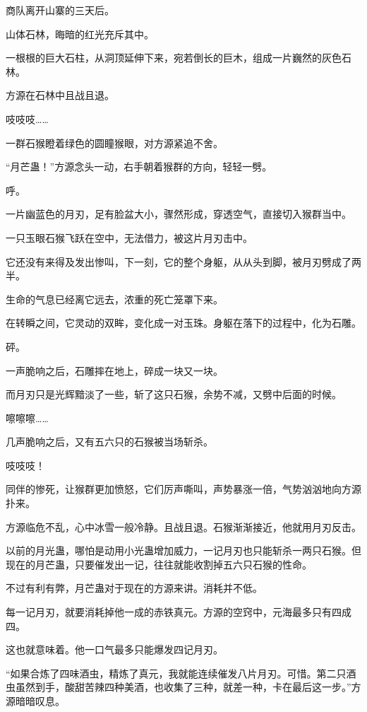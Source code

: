 
\begin{this_body}



商队离开山寨的三天后。

山体石林，晦暗的红光充斥其中。

一根根的巨大石柱，从洞顶延伸下来，宛若倒长的巨木，组成一片巍然的灰色石林。

方源在石林中且战且退。

吱吱吱……

一群石猴瞪着绿色的圆瞳猴眼，对方源紧追不舍。

“月芒蛊！”方源念头一动，右手朝着猴群的方向，轻轻一劈。

呼。

一片幽蓝色的月刃，足有脸盆大小，骤然形成，穿透空气，直接切入猴群当中。

一只玉眼石猴飞跃在空中，无法借力，被这片月刃击中。

它还没有来得及发出惨叫，下一刻，它的整个身躯，从从头到脚，被月刃劈成了两半。

生命的气息已经离它远去，浓重的死亡笼罩下来。

在转瞬之间，它灵动的双眸，变化成一对玉珠。身躯在落下的过程中，化为石雕。

砰。

一声脆响之后，石雕摔在地上，碎成一块又一块。

而月刃只是光辉黯淡了一些，斩了这只石猴，余势不减，又劈中后面的时候。

嚓嚓嚓……

几声脆响之后，又有五六只的石猴被当场斩杀。

吱吱吱！

同伴的惨死，让猴群更加愤怒，它们厉声嘶叫，声势暴涨一倍，气势汹汹地向方源扑来。

方源临危不乱，心中冰雪一般冷静。且战且退。石猴渐渐接近，他就用月刃反击。

以前的月光蛊，哪怕是动用小光蛊增加威力，一记月刃也只能斩杀一两只石猴。但现在的月芒蛊，只要催发出一记，往往就能收割掉五六只石猴的性命。

不过有利有弊，月芒蛊对于现在的方源来讲。消耗并不低。

每一记月刃，就要消耗掉他一成的赤铁真元。方源的空窍中，元海最多只有四成四。

这也就意味着。他一口气最多只能爆发四记月刃。

“如果合炼了四味酒虫，精炼了真元，我就能连续催发八片月刃。可惜。第二只酒虫虽然到手，酸甜苦辣四种美酒，也收集了三种，就差一种，卡在最后这一步。”方源暗暗叹息。


\end{this_body}
